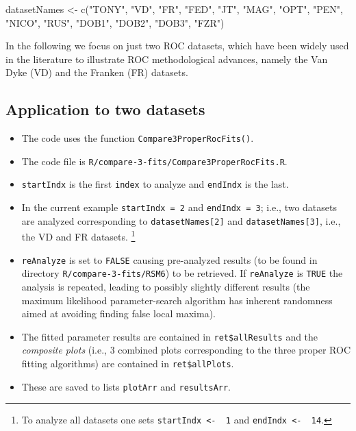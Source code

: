 \documentclass[
]{book}
\newenvironment{Shaded}{\begin{snugshade}}{\end{snugshade}}
\newcommand{\FunctionTok}[1]{\textcolor[rgb]{0.00,0.00,0.00}{#1}}
\newcommand{\NormalTok}[1]{#1}
\newcommand{\OtherTok}[1]{\textcolor[rgb]{0.56,0.35,0.01}{#1}}
\newcommand{\StringTok}[1]{\textcolor[rgb]{0.31,0.60,0.02}{#1}}
\providecommand{\tightlist}{%
  \setlength{\itemsep}{0pt}\setlength{\parskip}{0pt}}
\begin{document}
\begin{Shaded}
\begin{Highlighting}[]
\NormalTok{datasetNames }\OtherTok{\textless{}{-}}  \FunctionTok{c}\NormalTok{(}\StringTok{"TONY"}\NormalTok{, }\StringTok{"VD"}\NormalTok{, }\StringTok{"FR"}\NormalTok{, }
            \StringTok{"FED"}\NormalTok{, }\StringTok{"JT"}\NormalTok{, }\StringTok{"MAG"}\NormalTok{, }
            \StringTok{"OPT"}\NormalTok{, }\StringTok{"PEN"}\NormalTok{, }\StringTok{"NICO"}\NormalTok{,}
            \StringTok{"RUS"}\NormalTok{, }\StringTok{"DOB1"}\NormalTok{, }\StringTok{"DOB2"}\NormalTok{, }
            \StringTok{"DOB3"}\NormalTok{, }\StringTok{"FZR"}\NormalTok{)}
\end{Highlighting}
\end{Shaded}

In the following we focus on just two ROC datasets, which have been widely used in the literature to illustrate ROC methodological advances, namely the Van Dyke (VD) and the Franken (FR) datasets.

\hypertarget{rsm-3-fits-two-datasets}{%
\subsection{Application to two datasets}\label{rsm-3-fits-two-datasets}}

\begin{itemize}
\tightlist
\item
  The code uses the function \texttt{Compare3ProperRocFits()}.
\item
  The code file is \texttt{R/compare-3-fits/Compare3ProperRocFits.R}.
\item
  \texttt{startIndx} is the first \texttt{index} to analyze and \texttt{endIndx} is the last.
\item
  In the current example \texttt{startIndx\ =\ 2} and \texttt{endIndx\ =\ 3}; i.e., two datasets are analyzed corresponding to \texttt{datasetNames{[}2{]}} and \texttt{datasetNames{[}3{]}}, i.e., the VD and FR datasets. \footnote{To analyze all datasets one sets \texttt{startIndx\ \textless{}-\ \ 1} and \texttt{endIndx\ \textless{}-\ \ 14}.}
\item
  \texttt{reAnalyze} is set to \texttt{FALSE} causing pre-analyzed results (to be found in directory \texttt{R/compare-3-fits/RSM6}) to be retrieved. If \texttt{reAnalyze} is \texttt{TRUE} the analysis is repeated, leading to possibly slightly different results (the maximum likelihood parameter-search algorithm has inherent randomness aimed at avoiding finding false local maxima).
\item
  The fitted parameter results are contained in \texttt{ret\$allResults} and the \emph{composite plots} (i.e., 3 combined plots corresponding to the three proper ROC fitting algorithms) are contained in \texttt{ret\$allPlots}.
\item
  These are saved to lists \texttt{plotArr} and \texttt{resultsArr}.
\end{itemize}
\end{document}
